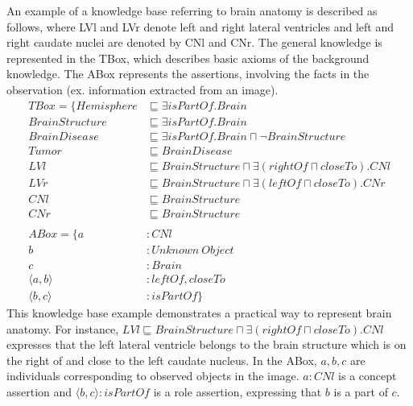 \documentclass{article}
\begin{document}
An example of a knowledge base referring to brain anatomy is described as follows, where LVl and LVr denote left and right lateral ventricles and left and right caudate nuclei are denoted by CNl and CNr.
The general knowledge is represented in the TBox, which describes basic axioms of the background knowledge. The ABox represents the assertions, involving the facts in the observation (ex. information
extracted from an image).
\begin{align*}
 TBox=\{ Hemisphere &\sqsubseteq \exists isPartOf. Brain\\
	 BrainStructure &\sqsubseteq \exists isPartOf. Brain\\
	 BrainDisease &\sqsubseteq \exists isPartOf. Brain \sqcap \neg BrainStructure\\
	 Tumor  &\sqsubseteq BrainDisease\\
	 LVl &\sqsubseteq BrainStructure \sqcap \exists (rightOf \sqcap closeTo). CNl\\
	 LVr &\sqsubseteq BrainStructure \sqcap \exists (leftOf \sqcap closeTo). CNr\\
	 CNl &\sqsubseteq BrainStructure\\
	 CNr &\sqsubseteq BrainStructure\\
\\
 ABox=\{ a&: CNl \\
	 b&: Unknown~Object\\
	 c&: Brain \\
	 \langle a,b\rangle &: leftOf, closeTo \\
	 \langle b,c\rangle &: isPartOf\}
\end{align*}
This knowledge base  example demonstrates a practical way to represent brain anatomy. 
For instance, $LVl \sqsubseteq BrainStructure \sqcap \exists (rightOf \sqcap closeTo). CNl$ expresses that
the left lateral ventricle belongs to the brain structure which is on the right of and close to the left caudate nucleus.
In the ABox, $a,b,c$ are individuals corresponding to observed objects in the image. $a: CNl$ is a concept assertion and 
$\langle b,c\rangle : isPartOf$ is a role assertion, expressing that $b$ is a part of $c$.
\end{document}
